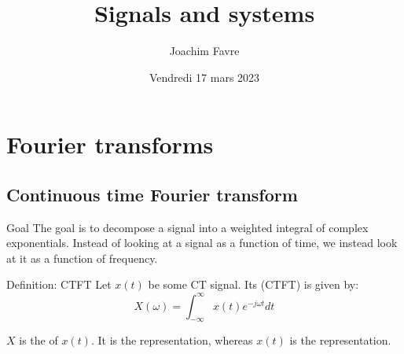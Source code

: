 \documentclass[a4paper]{article}
\title{Signals and systems}
\author{Joachim Favre}
\date{Vendredi 17 mars 2023}
\begin{document}
\maketitle


\section{Fourier transforms}
\subsection{Continuous time Fourier transform}
\begin{parag}{Goal}
    The goal is to decompose a signal into a weighted integral of complex exponentials. Instead of looking at a signal as a function of time, we instead look at it as a function of frequency.
\end{parag}

\begin{parag}{Definition: CTFT}
    Let $x\left(t\right)$ be some CT signal. Its  (CTFT) is given by: 
    \[X\left(\omega\right) = \int_{-\infty}^{\infty} x\left(t\right) e^{-j\omega t} dt\]

    $X$ is the  of $x\left(t\right)$. It is the  representation, whereas $x\left(t\right)$ is the  representation.
\end{parag}
\end{document}
